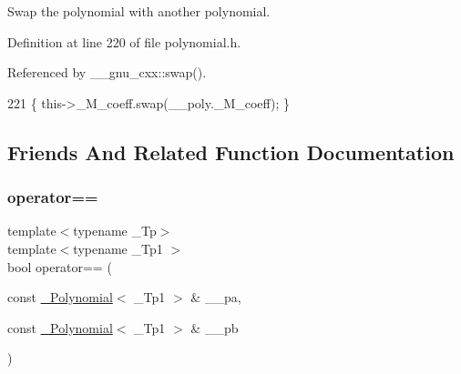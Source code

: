 Swap the polynomial with another polynomial. 

Definition at line 220 of file polynomial.\+h.



Referenced by \+\_\+\+\_\+gnu\+\_\+cxx\+::swap().


\begin{DoxyCode}
221       \{ this->\_M\_coeff.swap(\_\_poly.\_M\_coeff); \}
\end{DoxyCode}


\subsection{Friends And Related Function Documentation}
\mbox{\label{class____gnu__cxx_1_1__Polynomial_abb21e2bfe0dc97a44ae9eeffb6f930aa}} 
\subsubsection{\texorpdfstring{operator==}{operator==}}
{\footnotesize\ttfamily template$<$typename \+\_\+\+Tp$>$ \\
template$<$typename \+\_\+\+Tp1 $>$ \\
bool operator== (\begin{DoxyParamCaption}\item[{const \hyperlink{class____gnu__cxx_1_1__Polynomial}{\+\_\+\+Polynomial}$<$ \+\_\+\+Tp1 $>$ \&}]{\+\_\+\+\_\+pa,  }\item[{const \hyperlink{class____gnu__cxx_1_1__Polynomial}{\+\_\+\+Polynomial}$<$ \+\_\+\+Tp1 $>$ \&}]{\+\_\+\+\_\+pb }\end{DoxyParamCaption})\hspace{0.3cm}{\ttfamily [friend]}}

\mbox{\label{class____gnu__cxx_1_1__Polynomial_a929d1753cc00510f102f61a2bbeb0d2d}} 
